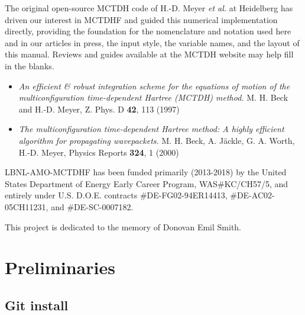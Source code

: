 \documentclass[10pt,leqno, oneside]{book}
\begin{document}

The original open-source MCTDH code of H.-D. Meyer \textit{et al.} at Heidelberg has driven our
interest in MCTDHF
and guided this numerical implementation directly, providing
the foundation for the nomenclature and notation used here and in our articles in press, the input style, the variable names, and the layout of this manual.
Reviews and guides available at the MCTDH website may help fill in the blanks.
\begin{itemize}[noitemsep]
%
\item{\textit{An efficient \& robust integration scheme for the equations of motion of the multiconfiguration time-dependent Hartree (MCTDH) method.}
M. H. Beck and H.-D. Meyer, Z. Phys. D \textbf{42}, 113 (1997)}
\item{\textit{The multiconfiguration time-dependent Hartree method: A highly efficient algorithm for propagating wavepackets.}
M. H. Beck, A. J{\"a}ckle, G. A. Worth, H.-D. Meyer, Physics Reports \textbf{324}, 1 (2000)}
\end{itemize}

LBNL-AMO-MCTDHF  has been funded 
primarily (2013-2018)
by the United States Department of Energy Early Career Program, 
WAS\#KC/CH57/5, and entirely
under U.S. D.O.E. contracts 
\#DE-FG02-94ER14413, %
\#DE-AC02-05CH11231, %
and \#DE-SC-0007182. %

This project is dedicated to the memory of Donovan Emil Smith.









\tableofcontents




\chapter*{Preliminaries}


\section{Git install}
\end{document}
